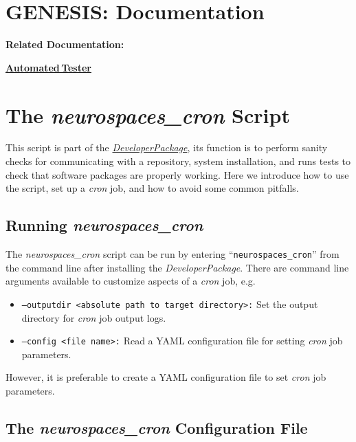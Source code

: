 \documentclass[12pt]{article}
\begin{document}
\section*{GENESIS: Documentation}

{\bf Related Documentation:}

\href{../neurospaces-tester/neurospaces-tester.tex}{\bf Automated\,Tester}

\section*{The {\it neurospaces\_cron} Script}

This script is part of the \href{../developer-package}{\it DeveloperPackage}, its function is to perform sanity checks for communicating with a repository, system installation, and runs tests to check that software packages are properly working. Here we introduce how to use the script, set up a {\it cron} job, and how to avoid some common pitfalls.

\subsection*{Running {\it neurospaces\_cron}}

The {\it neurospaces\_cron} script can be run by entering ``{\tt neurospaces\_cron}'' from the command line after installing the {\it DeveloperPackage}. There are command line arguments available to customize aspects of a {\it cron} job, e.g.
\begin{itemize}
   \item {\tt --outputdir <absolute path to target directory>:} Set the output directory for {\it cron} job output logs.
   \item {\tt --config <file name>:} Read a YAML configuration file for setting {\it cron} job parameters.
\end{itemize}
However, it is preferable to create a YAML configuration file to set {\it cron} job parameters.

\subsection*{The  {\it neurospaces\_cron} Configuration File}
\end{document}
